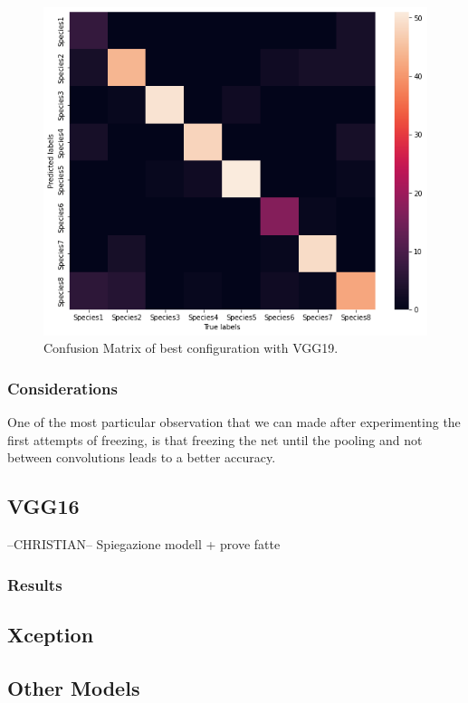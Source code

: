 \documentclass[10pt]{article}
\begin{document}
\begin{figure}[ht]
\begin{center}
\centerline{\includegraphics[width=\columnwidth]{VGG19_best}}
\caption{Confusion Matrix of best configuration with VGG19.}
\label{bayespic}
\end{center}
\end{figure}
\subsubsection{Considerations}
One of the most particular observation that we can made after experimenting the first attempts of freezing, is that freezing the net
until the pooling and not between convolutions leads to a better accuracy.

\subsection{VGG16}
--CHRISTIAN--
Spiegazione modell + prove fatte
\subsubsection{Results}
\subsection{Xception}

\subsection{Other Models}
\end{document}
